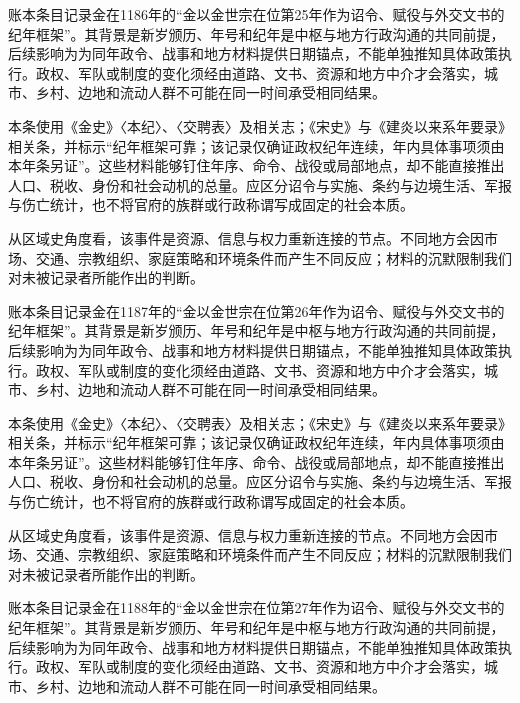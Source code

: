 账本条目记录金在1186年的“金以金世宗在位第25年作为诏令、赋役与外交文书的纪年框架”。其背景是新岁颁历、年号和纪年是中枢与地方行政沟通的共同前提，后续影响为为同年政令、战事和地方材料提供日期锚点，不能单独推知具体政策执行。政权、军队或制度的变化须经由道路、文书、资源和地方中介才会落实，城市、乡村、边地和流动人群不可能在同一时间承受相同结果。

本条使用《金史》〈本纪〉、〈交聘表〉及相关志；《宋史》与《建炎以来系年要录》相关条，并标示“纪年框架可靠；该记录仅确证政权纪年连续，年内具体事项须由本年条另证”。这些材料能够钉住年序、命令、战役或局部地点，却不能直接推出人口、税收、身份和社会动机的总量。应区分诏令与实施、条约与边境生活、军报与伤亡统计，也不将官府的族群或行政称谓写成固定的社会本质。

从区域史角度看，该事件是资源、信息与权力重新连接的节点。不同地方会因市场、交通、宗教组织、家庭策略和环境条件而产生不同反应；材料的沉默限制我们对未被记录者所能作出的判断。

账本条目记录金在1187年的“金以金世宗在位第26年作为诏令、赋役与外交文书的纪年框架”。其背景是新岁颁历、年号和纪年是中枢与地方行政沟通的共同前提，后续影响为为同年政令、战事和地方材料提供日期锚点，不能单独推知具体政策执行。政权、军队或制度的变化须经由道路、文书、资源和地方中介才会落实，城市、乡村、边地和流动人群不可能在同一时间承受相同结果。

本条使用《金史》〈本纪〉、〈交聘表〉及相关志；《宋史》与《建炎以来系年要录》相关条，并标示“纪年框架可靠；该记录仅确证政权纪年连续，年内具体事项须由本年条另证”。这些材料能够钉住年序、命令、战役或局部地点，却不能直接推出人口、税收、身份和社会动机的总量。应区分诏令与实施、条约与边境生活、军报与伤亡统计，也不将官府的族群或行政称谓写成固定的社会本质。

从区域史角度看，该事件是资源、信息与权力重新连接的节点。不同地方会因市场、交通、宗教组织、家庭策略和环境条件而产生不同反应；材料的沉默限制我们对未被记录者所能作出的判断。

账本条目记录金在1188年的“金以金世宗在位第27年作为诏令、赋役与外交文书的纪年框架”。其背景是新岁颁历、年号和纪年是中枢与地方行政沟通的共同前提，后续影响为为同年政令、战事和地方材料提供日期锚点，不能单独推知具体政策执行。政权、军队或制度的变化须经由道路、文书、资源和地方中介才会落实，城市、乡村、边地和流动人群不可能在同一时间承受相同结果。

